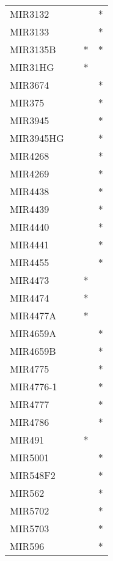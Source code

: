 \begin{longtable}{lccc}
MIR3132        &           &     &       * \\
MIR3133        &           &     &       * \\
MIR3135B       &           &   * &       * \\
MIR31HG        &           &   * &         \\
MIR3674        &           &     &       * \\
MIR375         &           &     &       * \\
MIR3945        &           &     &       * \\
MIR3945HG      &           &     &       * \\
MIR4268        &           &     &       * \\
MIR4269        &           &     &       * \\
MIR4438        &           &     &       * \\
MIR4439        &           &     &       * \\
MIR4440        &           &     &       * \\
MIR4441        &           &     &       * \\
MIR4455        &           &     &       * \\
MIR4473        &           &   * &         \\
MIR4474        &           &   * &         \\
MIR4477A       &           &   * &         \\
MIR4659A       &           &     &       * \\
MIR4659B       &           &     &       * \\
MIR4775        &           &     &       * \\
MIR4776-1      &           &     &       * \\
MIR4777        &           &     &       * \\
MIR4786        &           &     &       * \\
MIR491         &           &   * &         \\
MIR5001        &           &     &       * \\
MIR548F2       &           &     &       * \\
MIR562         &           &     &       * \\
MIR5702        &           &     &       * \\
MIR5703        &           &     &       * \\
MIR596         &           &     &       * \\

\end{longtable}
